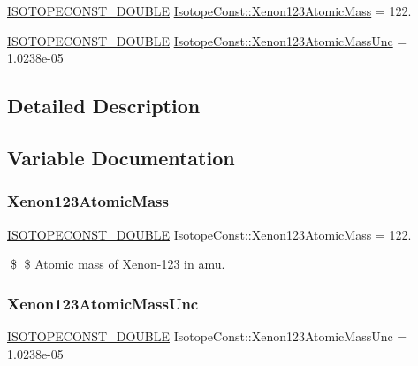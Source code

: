 \begin{DoxyCompactItemize}
\item 
\mbox{\hyperlink{group___isotope_const-_macros_ga8f45a7272ce02c0b4c65c44636ed719a}{I\+S\+O\+T\+O\+P\+E\+C\+O\+N\+S\+T\+\_\+\+D\+O\+U\+B\+LE}} \mbox{\hyperlink{group___isotope_const-_xenon-_xe123_gab987a5e8db9bba057bb7403ed90b7c95}{Isotope\+Const\+::\+Xenon123\+Atomic\+Mass}} = 122.
\item 
\mbox{\hyperlink{group___isotope_const-_macros_ga8f45a7272ce02c0b4c65c44636ed719a}{I\+S\+O\+T\+O\+P\+E\+C\+O\+N\+S\+T\+\_\+\+D\+O\+U\+B\+LE}} \mbox{\hyperlink{group___isotope_const-_xenon-_xe123_gab70ae4d4ee1db74607a2518d72ef6a08}{Isotope\+Const\+::\+Xenon123\+Atomic\+Mass\+Unc}} = 1.\+0238e-\/05
\end{DoxyCompactItemize}


\subsection{Detailed Description}


\subsection{Variable Documentation}
\mbox{\label{group___isotope_const-_xenon-_xe123_gab987a5e8db9bba057bb7403ed90b7c95}} 
\subsubsection{\texorpdfstring{Xenon123\+Atomic\+Mass}{Xenon123AtomicMass}}
{\footnotesize\ttfamily \mbox{\hyperlink{group___isotope_const-_macros_ga8f45a7272ce02c0b4c65c44636ed719a}{I\+S\+O\+T\+O\+P\+E\+C\+O\+N\+S\+T\+\_\+\+D\+O\+U\+B\+LE}} Isotope\+Const\+::\+Xenon123\+Atomic\+Mass = 122.}

\$ \$ Atomic mass of Xenon-\/123 in amu. \mbox{\label{group___isotope_const-_xenon-_xe123_gab70ae4d4ee1db74607a2518d72ef6a08}} 
\subsubsection{\texorpdfstring{Xenon123\+Atomic\+Mass\+Unc}{Xenon123AtomicMassUnc}}
{\footnotesize\ttfamily \mbox{\hyperlink{group___isotope_const-_macros_ga8f45a7272ce02c0b4c65c44636ed719a}{I\+S\+O\+T\+O\+P\+E\+C\+O\+N\+S\+T\+\_\+\+D\+O\+U\+B\+LE}} Isotope\+Const\+::\+Xenon123\+Atomic\+Mass\+Unc = 1.\+0238e-\/05}

